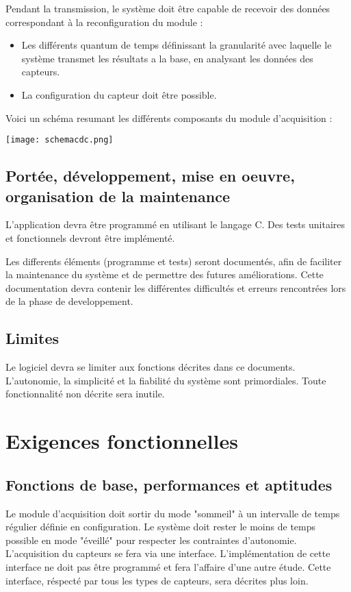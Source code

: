 Pendant la transmission, le système doit être capable de recevoir des données correspondant à la reconfiguration du module :

\begin{itemize}
\item Les différents quantum de temps définissant la granularité avec laquelle le système transmet les résultats a la base, en analysant les données des capteurs.
\item La configuration du capteur doit être possible.
\end{itemize}

Voici un schéma resumant les différents composants du module d'acquisition :

\texttt{[image: schemacdc.png]}

\subsection{Portée, développement, mise en oeuvre, organisation de la maintenance}

L'application devra être programmé en utilisant le langage C. Des tests unitaires et fonctionnels devront être implémenté.

Les differents éléments (programme et tests) seront documentés, afin de faciliter la maintenance du système et de permettre des futures améliorations. Cette documentation devra contenir les différentes difficultés et erreurs rencontrées lors de la phase de developpement.

\subsection{Limites}

Le logiciel devra se limiter aux fonctions décrites dans ce documents. L'autonomie, la simplicité et la fiabilité du système sont primordiales. Toute fonctionnalité non décrite sera inutile.

\section{Exigences fonctionnelles}
\subsection{Fonctions de base, performances et aptitudes}

Le module d'acquisition doit sortir du mode "sommeil" à un intervalle de temps régulier définie en configuration. Le système doit rester le moins de temps possible en mode "éveillé" pour respecter les contraintes d'autonomie.
L'acquisition du capteurs se fera via une interface. L'implémentation de cette interface ne doit pas être programmé et fera l'affaire d'une autre étude. Cette interface, réspecté par tous les types de capteurs, sera décrites plus loin.

